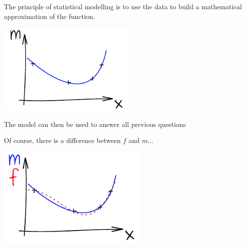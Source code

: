 \documentclass{beamer}
\begin{document}
\begin{frame}{}
The principle of statistical modelling is to use the data to build a mathematical approximation of the function. 
\begin{center}
\includegraphics[height=4.5cm]{figures/ink_m}
\end{center}
The model can then be used to answer all previous questions
\end{frame}

\begin{frame}{}
Of course, there is a difference between $f$ and $m$...
\begin{center}
\includegraphics[height=5cm]{figures/ink_mf}
\end{center}
\end{frame}
\end{document}
